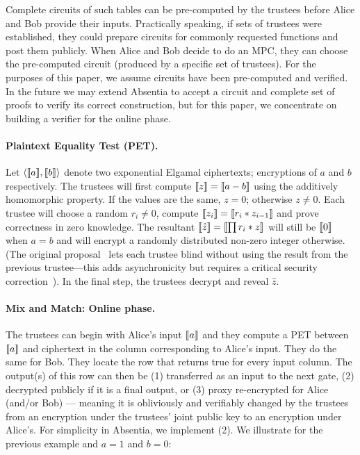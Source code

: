 Complete circuits of such tables can be pre-computed by the trustees before Alice and Bob provide their inputs. Practically speaking, if sets of trustees were established, they could prepare circuits for commonly requested functions and post them publicly. When Alice and Bob decide to do an MPC, they can choose the pre-computed circuit (produced by a specific set of trustees). For the purposes of this paper, we assume circuits have been pre-computed and verified. In the future we may extend Absentia to accept a circuit and complete set of proofs to verify its correct construction, but for this paper, we concentrate on building a verifier for the online phase.

\paragraph{Plaintext Equality Test (PET).} Let $\left \langle \llbracket a \rrbracket,\llbracket b \rrbracket \right \rangle$ denote two exponential Elgamal ciphertexts; encryptions of $a$ and $b$ respectively. The trustees will first compute $\llbracket z \rrbracket=\llbracket a-b \rrbracket$ using the additively homomorphic property. If the values are the same, $z=0$; otherwise $z\neq 0$. Each trustee will choose a random $r_i\neq0$, compute $\llbracket z_i \rrbracket=\llbracket r_i*z_{i-1} \rrbracket$ and prove correctness in zero knowledge. The resultant $\llbracket \hat{z} \rrbracket=\llbracket \prod r_i*z \rrbracket$ will still be $\llbracket 0 \rrbracket$ when $a=b$ and will encrypt a randomly distributed non-zero integer otherwise. (The original proposal~\cite{JJ00} lets each trustee blind without using the result from the previous trustee---this adds asynchronicity but requires a critical security correction~\cite{mcmurtry2020test}). In the final step, the trustees decrypt and reveal $\hat{z}$.

\paragraph{Mix and Match: Online phase.} The trustees can begin with Alice's input $\llbracket a \rrbracket$ and they compute a PET between $\llbracket a \rrbracket$ and ciphertext in the column corresponding to Alice's input. They do the same for Bob. They locate the row that returns true for every input column. The output(s) of this row can then be (1) transferred as an input to the next gate, (2) decrypted publicly if it is a final output, or (3) proxy re-encrypted for Alice (and/or Bob) --- meaning it is obliviously and verifiably changed by the trustees from an encryption under the trustees' joint public key to an encryption under Alice's. For simplicity in Absentia, we implement (2). We illustrate for the previous example and $a=1$ and $b=0$:

